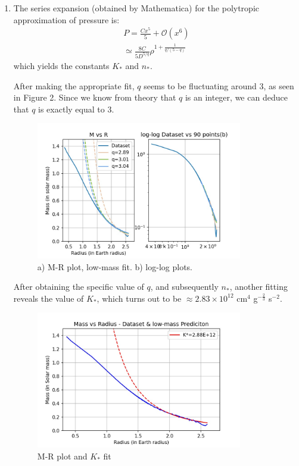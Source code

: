 \documentclass[a4paper]{article}
\begin{document}
\begin{enumerate}[label=(\alph*)]
    \item The series expansion (obtained by Mathematica) for the polytropic approximation of pressure is:
    \begin{align}
        P = \frac{Cx^{5}}{5} + \mathcal{O}(x^{6}) \nonumber \\
        \simeq \frac{8C}{5D^{{5} / {q}}} \rho^{1 + \frac{1}{{q} / {(5-q)}}}
    \end{align}
    which yields the constants $K_{*}$ and $n_{*}$.
    
    After making the appropriate fit, $q$ seems to be fluctuating around $3$, as seen in Figure 2. Since we know from theory that $q$ is an integer, we can deduce that $q$ is exactly equal to 3.
    \begin{figure}[H] 
    \centering
    \includegraphics[width=0.85\textwidth]{WD_loglog.jpg}
    \caption{a) M-R plot, low-mass fit. b) log-log plots.}
    \end{figure}
    
    After obtaining the specific value of $q$, and subsequently $n_{*}$, another fitting reveals the value of $K_{*}$, which turns out to be $\approx 2.83 \times 10^{12}$ cm$^{4}$ g$^{-\frac{2}{3}}$ s$^{-2}$. 
    
    \begin{figure}[H] 
    \centering
    \includegraphics[width=0.85\textwidth]{WD_DatvPrd.jpg}
    \caption{M-R plot and $K_{*}$ fit}
    \end{figure}
    

\end{enumerate}
\end{document}
